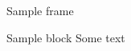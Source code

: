 \documentclass[aspectratio=169]{beamer}
\begin{document}
\begin{frame}[plain]


    
\end{frame}



  \begin{frame}{Sample frame}
    \begin{block}{Sample block}
      Some text\footnotemark[1]
    \end{block}
  \end{frame}
\end{document}
